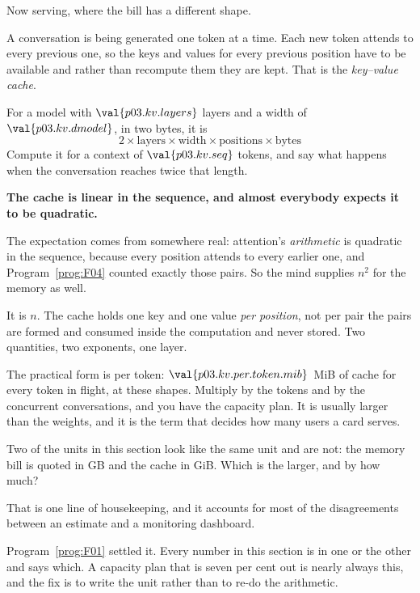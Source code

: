 \begin{fr}
Now serving, where the bill has a different shape.

A conversation is being generated one token at a time. Each new token attends
to every previous one, so the keys and values for every previous position have
to be available \dash{} and rather than recompute them they are kept. That is
the \emph{key--value cache}.

For a model with $\val{p03.kv.layers}$ layers and a width of
$\val{p03.kv.dmodel}$, in two bytes, it is
\[ 2 \times \text{layers} \times \text{width} \times \text{positions}
   \times \text{bytes} \]
Compute it for a context of $\val{p03.kv.seq}$ tokens, and say what happens
when the conversation reaches twice that length.
\nextframe
\end{fr}

\begin{fr}
\begin{trapbox}
\textbf{The cache is linear in the sequence, and almost everybody expects it to
be quadratic.}

The expectation comes from somewhere real: attention's \emph{arithmetic} is
quadratic in the sequence, because every position attends to every earlier one,
and Program~\ref{prog:F04} counted exactly those pairs. So the mind supplies
$n^{2}$ for the memory as well.

It is $n$. The cache holds one key and one value \emph{per position}, not per
pair \dash{} the pairs are formed and consumed inside the computation and never
stored. Two quantities, two exponents, one layer.

The practical form is per token: $\val{p03.kv.per.token.mib}$~MiB of cache for
every token in flight, at these shapes. Multiply by the tokens and by the
concurrent conversations, and you have the capacity plan. It is usually larger
than the weights, and it is the term that decides how many users a card
serves.
\end{trapbox}

Two of the units in this section look like the same unit and are not: the
memory bill is quoted in GB and the cache in GiB. Which is the larger, and by
how much?
\dotline
\nextframe
\end{fr}

\begin{fr}

That is one line of housekeeping, and it accounts for most of the
disagreements between an estimate and a monitoring dashboard.

Program~\ref{prog:F01} settled it. Every number in this
section is in one or the other and says which. A capacity plan that is seven
per cent out is nearly always this, and the fix is to write the unit rather
than to re-do the arithmetic.
\end{fr}

